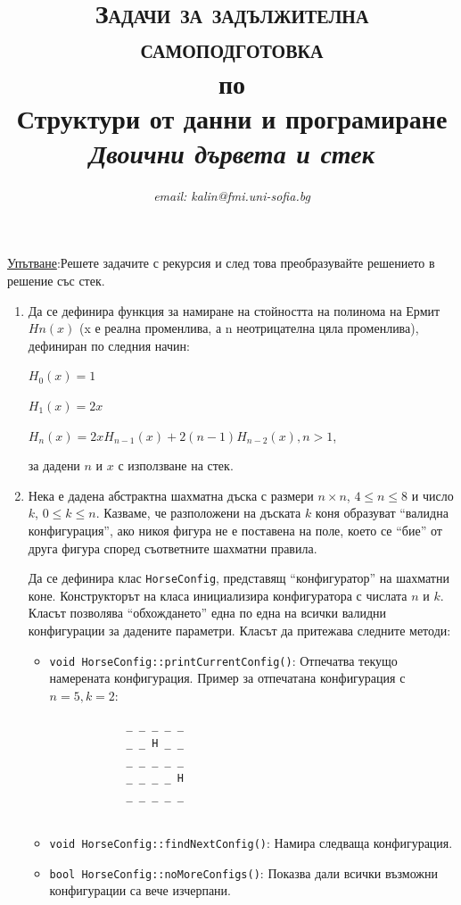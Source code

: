 \documentclass[12pt,a4paper]{article}
\author{\textit{email: kalin@fmi.uni-sofia.bg}}
\title{\textsc{Задачи за задължителна самоподготовка} \\
по \\
Структури от данни и програмиране\\
\textit{Двоични дървета и стек}}
\begin{document}
\maketitle

 \underline{Упътване}:Решете задачите с рекурсия и след това преобразувайте решението в решение със стек.



\begin{enumerate}

	\item Да се дефинира функция за намиране на стойността на полинома на Ермит $Hn(x)$ (x е реална променлива, а n неотрицателна цяла променлива), дефиниран по следния начин:

	$H_0(x)=1$

	$H_1(x)=2x$

	$H_n(x)=2xH_{n-1}(x)+2(n-1)H_{n-2}(x), n>1$,

	за дадени $n$ и $x$ с използване на стек.


	\item Нека е дадена абстрактна шахматна дъска с размери $n \times n$, $4 \le n \le 8$ и число $k$, $0 \le k \le n$. Казваме, че разположени на дъската  $k$ коня образуват ``валидна конфигурация'', ако никоя фигура не е поставена на поле, което се ``бие'' от друга фигура според съответните шахматни правила. 

	Да се дефинира клас \texttt{HorseConfig}, представящ ``конфигуратор'' на шахматни коне. Конструкторът на класа инициализира конфигуратора с числата $n$ и $k$. Класът позволява ``обхождането'' една по една на всички валидни конфигурации за дадените параметри. Класът да притежава следните методи:

	\begin{itemize}
		\item \texttt{void HorseConfig::printCurrentConfig()}: Отпечатва текущо намерената конфигурация.
			Пример за отпечатана конфигурация с $n=5, k=2$:
			\begin{verbatim}
			_ _ _ _ _
			_ _ H _ _
			_ _ _ _ _
			_ _ _ _ H
			_ _ _ _ _
				
			\end{verbatim}		
		\item \texttt{void HorseConfig::findNextConfig()}: Намира следваща конфигурация.
		\item \texttt{bool HorseConfig::noMoreConfigs()}: Показва дали всички възможни конфигурации са вече изчерпани.
	\end{itemize}



\end{enumerate}
\end{document}
